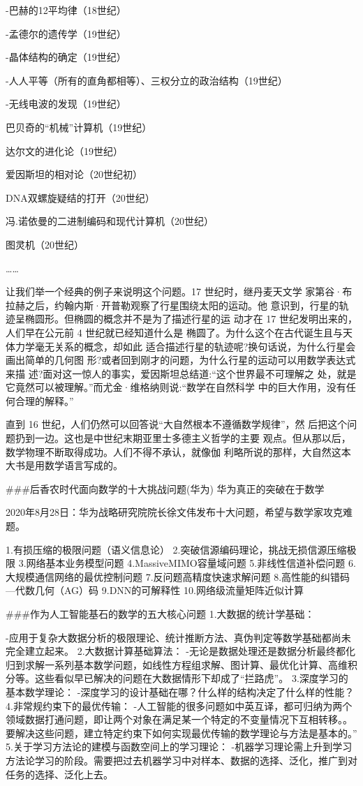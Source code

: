 -巴赫的12平均律（18世纪）

-孟德尔的遗传学（19世纪）

-晶体结构的确定（19世纪）

-人人平等（所有的直角都相等）、三权分立的政治结构（19世纪）

-无线电波的发现（19世纪）

巴贝奇的“机械”计算机（19世纪）

达尔文的进化论（19世纪）

爱因斯坦的相对论（20世纪初）

DNA双螺旋疑结的打开（20世纪）

冯.诺依曼的二进制编码和现代计算机（20世纪）

图灵机（20世纪）

……

让我们举一个经典的例子来说明这个问题。17 世纪时，继丹麦天文学 家第谷·布拉赫之后，约翰内斯·开普勒观察了行星围绕太阳的运动。他 意识到，行星的轨迹呈椭圆形。但椭圆的概念并不是为了描述行星的运 动才在 17 世纪发明出来的，人们早在公元前 4 世纪就已经知道什么是 椭圆了。为什么这个在古代诞生且与天体力学毫无关系的概念，却如此 适合描述行星的轨迹呢?换句话说，为什么行星会画出简单的几何图 形?或者回到刚才的问题，为什么行星的运动可以用数学表达式来描 述?面对这一惊人的事实，爱因斯坦总结道:“这个世界最不可理解之 处，就是它竟然可以被理解。”而尤金·维格纳则说:“数学在自然科学 中的巨大作用，没有任何合理的解释。” 

直到 16 世纪，人们仍然可以回答说“大自然根本不遵循数学规律”，然 后把这个问题扔到一边。这也是中世纪末期亚里士多德主义哲学的主要 观点。但从那以后，数学物理不断取得成功。人们不得不承认，就像伽 利略所说的那样，大自然这本大书是用数学语言写成的。 


###后香农时代面向数学的十大挑战问题(华为)
华为真正的突破在于数学

2020年8月28日：华为战略研究院院长徐文伟发布十大问题，希望与数学家攻克难题。

1.有损压缩的极限问题（语义信息论）
2.突破信源编码理论，挑战无损信源压缩极限
3.网络基本业务模型问题
4.MassiveMIMO容量域问题
5.非线性信道补偿问题
6.大规模通信网络的最优控制问题
7.反问题高精度快速求解问题
8.高性能的纠错码—代数几何（AG）码
9.DNN的可解释性
10.网络级流量矩阵近似计算


###作为人工智能基石的数学的五大核心问题
1.大数据的统计学基础：

-应用于复杂大数据分析的极限理论、统计推断方法、真伪判定等数学基础都尚未完全建立起来。
2.大数据计算基础算法：
-无论是数据处理还是数据分析最终都化归到求解一系列基本数学问题，如线性方程组求解、图计算、最优化计算、高维积分等。这些看似早已解决的问题在大数据情形下却成了“拦路虎”。
3.深度学习的基本数学理论：
-深度学习的设计基础在哪？什么样的结构决定了什么样的性能？
4.非常规约束下的最优传输：
-人工智能的很多问题如中英互译，都可归纳为两个领域数据打通问题，即让两个对象在满足某一个特定的不变量情况下互相转移。。要解决这些问题，建立特定约束下如何实现最优传输的数学理论与方法是基本的。”
5.关于学习方法论的建模与函数空间上的学习理论：
-机器学习理论需上升到学习方法论学习的阶段。需要把过去机器学习中对样本、数据的选择、泛化，推广到对任务的选择、泛化上去。


